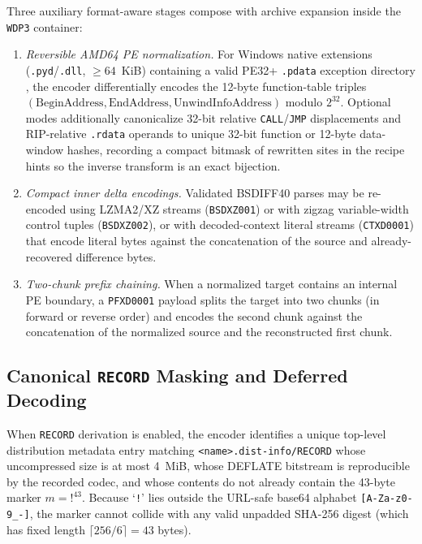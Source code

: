 \documentclass[10pt,letterpaper]{article}
\theoremstyle{remark}
\begin{document}
Three auxiliary format-aware stages compose with archive expansion inside the \texttt{WDP3} container:
\begin{enumerate}
  \item \emph{Reversible AMD64 PE normalization.} For Windows native extensions (\texttt{.pyd}/\texttt{.dll}, $\ge 64$~KiB) containing a valid PE32+ \texttt{.pdata} exception directory \cite{peformat}, the encoder differentially encodes the 12-byte function-table triples $(\text{BeginAddress}, \text{EndAddress}, \text{UnwindInfoAddress})$ modulo $2^{32}$. Optional modes additionally canonicalize 32-bit relative \texttt{CALL}/\texttt{JMP} displacements and RIP-relative \texttt{.rdata} operands to unique 32-bit function or 12-byte data-window hashes, recording a compact bitmask of rewritten sites in the recipe hints so the inverse transform is an exact bijection.
  \item \emph{Compact inner delta encodings.} Validated BSDIFF40 parses may be re-encoded using LZMA2/XZ streams \cite{xzformat} (\texttt{BSDXZ001}) or with zigzag variable-width control tuples (\texttt{BSDXZ002}), or with decoded-context literal streams (\texttt{CTXD0001}) that encode literal bytes against the concatenation of the source and already-recovered difference bytes.
  \item \emph{Two-chunk prefix chaining.} When a normalized target contains an internal PE boundary, a \texttt{PFXD0001} payload splits the target into two chunks (in forward or reverse order) and encodes the second chunk against the concatenation of the normalized source and the reconstructed first chunk.
\end{enumerate}

\subsection{Canonical \texttt{RECORD} Masking and Deferred Decoding}
\label{sec:record}

When \texttt{RECORD} derivation is enabled, the encoder identifies a unique top-level distribution metadata entry matching \texttt{<name>.dist-info/RECORD} whose uncompressed size is at most 4~MiB, whose DEFLATE bitstream is reproducible by the recorded codec, and whose contents do not already contain the 43-byte marker $m = \texttt{!}^{43}$. Because `\texttt{!}' lies outside the URL-safe base64 alphabet \texttt{[A-Za-z0-9\_-]}, the marker cannot collide with any valid unpadded SHA-256 digest (which has fixed length $\lceil 256/6 \rceil = 43$ bytes).
\end{document}
